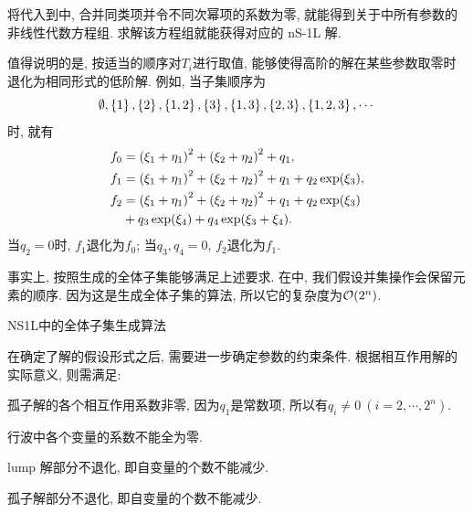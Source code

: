 将代入到中, 合并同类项并令不同次幂项的系数为零, 就能得到关于中所有参数的非线性代数方程组. 求解该方程组就能获得对应的 nS-1L 解. 

值得说明的是, 按适当的顺序对$T_i$进行取值, 能够使得高阶的解在某些参数取零时退化为相同形式的低阶解. 例如, 当子集顺序为
\begin{equation}
    \emptyset,\left\{1\right\},\left\{2\right\},\left\{1,2\right\},\left\{3\right\},\left\{1,3\right\},\left\{2,3\right\},\left\{1,2,3\right\},\cdots
\end{equation}
时, 就有 
\begin{equation}
\begin{aligned}
    f_0 &= \left(\xi_1+\eta_1\right)^2+\left(\xi_2+\eta_2\right)^2+q_1, \\
    f_1 &= \left(\xi_1+\eta_1\right)^2+\left(\xi_2+\eta_2\right)^2+q_1+q_2 \exp(\xi_3), \\ 
    f_2 &= \left(\xi_1+\eta_1\right)^2+\left(\xi_2+\eta_2\right)^2+q_1+q_2 \exp(\xi_3) \\
        & +q_3 \exp(\xi_4) + q_4 \exp(\xi_3+\xi_4).
\end{aligned} 
\end{equation}
当$q_2=0$时, $f_1$退化为$f_0$; 当$q_3,q_4=0$, $f_2$退化为$f_1$. 

事实上, 按照生成的全体子集能够满足上述要求. 在中, 我们假设并集操作会保留元素的顺序. 因为这是生成全体子集的算法, 所以它的复杂度为$\mathcal O(2^n)$. 

\begin{algorithm}[ht]
\caption{NS1L中的全体子集生成算法}\label{allsubset}
\end{algorithm}

在确定了解的假设形式之后, 需要进一步确定参数的约束条件. 根据相互作用解的实际意义, 则需满足:
\begin{compactenum}[(1)]
\item 孤子解的各个相互作用系数非零, 因为$q_1$是常数项, 所以有$q_i\neq 0~(i=2,\cdots,2^n)$.
\item 行波中各个变量的系数不能全为零. 
\item lump 解部分不退化, 即自变量的个数不能减少.
\item 孤子解部分不退化, 即自变量的个数不能减少. 
\end{compactenum}

